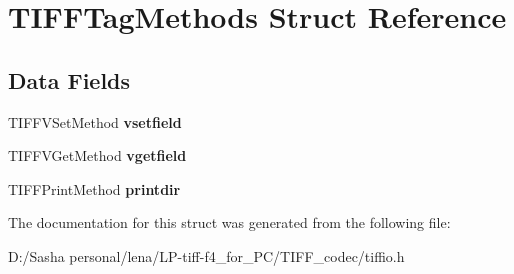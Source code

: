 \hypertarget{struct_t_i_f_f_tag_methods}{}\section{T\+I\+F\+F\+Tag\+Methods Struct Reference}
\label{struct_t_i_f_f_tag_methods}
\subsection*{Data Fields}
\begin{DoxyCompactItemize}
\item 
\hypertarget{struct_t_i_f_f_tag_methods_a6090b43cbbcda22bfd8cf8644464e06f}{}T\+I\+F\+F\+V\+Set\+Method {\bfseries vsetfield}\label{struct_t_i_f_f_tag_methods_a6090b43cbbcda22bfd8cf8644464e06f}

\item 
\hypertarget{struct_t_i_f_f_tag_methods_a0fc40751c80434badde4bc1e2ea878b5}{}T\+I\+F\+F\+V\+Get\+Method {\bfseries vgetfield}\label{struct_t_i_f_f_tag_methods_a0fc40751c80434badde4bc1e2ea878b5}

\item 
\hypertarget{struct_t_i_f_f_tag_methods_ac3f672c5186abaf1350e3e0b70245ad7}{}T\+I\+F\+F\+Print\+Method {\bfseries printdir}\label{struct_t_i_f_f_tag_methods_ac3f672c5186abaf1350e3e0b70245ad7}

\end{DoxyCompactItemize}


The documentation for this struct was generated from the following file\+:\begin{DoxyCompactItemize}
\item 
D\+:/\+Sasha personal/lena/\+L\+P-\/tiff-\/f4\+\_\+for\+\_\+\+P\+C/\+T\+I\+F\+F\+\_\+codec/tiffio.\+h\end{DoxyCompactItemize}
